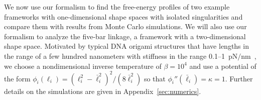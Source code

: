 \smallbreak
We now use our formalism to find the free-energy profiles of two example frameworks with one-dimensional shape spaces with isolated singularities and compare them with results from Monte Carlo simulations.
We will also use our formalism to analyze the five-bar linkage, a framework with a two-dimensional shape space.
Motivated by typical DNA origami structures that have lengths in the range of a few hundred nanometers with stiffness in the range 0.1--1~pN$/$nm~\cite{jung2020}, we choose a nondimensional inverse temperature of $\beta = 10^{4}$ and use a potential of the form $\phi_{i}(\ell_{i}) = (\ell_{i}^{2} - \bar{\ell}_{i}^{2})^{2}/(8\bar{\ell}_{i}^{2})$ so that $\phi_{i}''(\bar{\ell}_{i}) = \kappa = 1$.
Further details on the simulations are given in Appendix~\ref{sec:numerics}.


